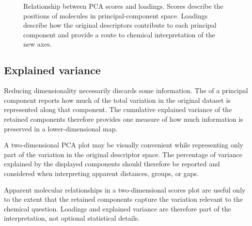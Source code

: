 \begin{figure}[htbp]
{%
  }

  \caption{
    Relationship between PCA scores and loadings.
    Scores describe the positions of molecules in principal-component space.
    Loadings describe how the original descriptors contribute to each principal component and  provide a route to chemical interpretation of the new axes.
  }
  \label{fig4:pca-scores-loadings}
\end{figure}


\subsection{Explained variance}

Reducing dimensionality necessarily discards some information.
The  of a principal component reports how much of the total variation in the original dataset is represented along that component.
The cumulative explained variance of the retained components therefore provides one measure of how much information is preserved in a lower-dimensional map.

A two-dimensional PCA plot may be visually convenient while representing only part of the variation in the original descriptor space.
The percentage of variance explained by the displayed components should therefore be reported and considered when interpreting apparent distances, groups, or gaps.

\begin{conceptbox}
  Apparent molecular relationships in a two-dimensional scores plot are useful only to the extent that the retained components capture the variation relevant to the chemical question.
  Loadings and explained variance are therefore part of the interpretation, not optional statistical details.
\end{conceptbox}

